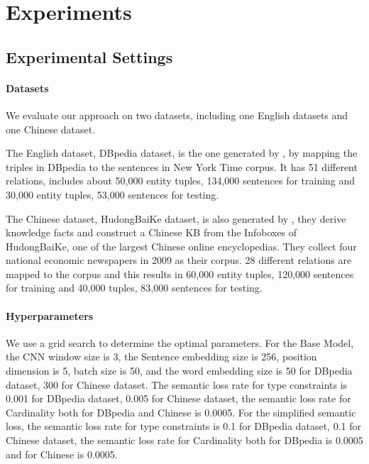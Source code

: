 \section{Experiments}

\subsection{Experimental Settings}
\paragraph{Datasets}
We evaluate our approach on two datasets, including one English datasets and one Chinese dataset.

The English dataset, DBpedia dataset, is the one generated by \cite{chen2014encoding}, by mapping the triples in DBpedia \cite{bizer2009dbpedia} to the sentences in New York Time corpus. It has 51 different relations, includes about 50,000 entity tuples, 134,000 sentences for training and 30,000 entity tuples, 53,000 sentences for testing.

The Chinese dataset, HudongBaiKe dataset, is also generated by \cite{chen2014encoding}, they derive knowledge facts and construct a Chinese KB from the Infoboxes of HudongBaiKe, one of the largest Chinese online encyclopedias. They collect four national economic newspapers in 2009 as their corpus. 28 different relations are mapped to the corpus and this results in 60,000 entity tuples, 120,000 sentences for training and 40,000 tuples, 83,000 sentences for testing.

\paragraph{Hyperparameters}
We use a grid search to determine the optimal parameters. For the Base Model, the CNN window size is 3, the Sentence embedding size is 256, position dimension is 5, batch size is 50, and the word embedding size is 50 for DBpedia dataset, 300 for Chinese dataset. The semantic loss rate for type constraints is 0.001 for DBpedia dataset, 0.005 for Chinese dataset, the semantic loss rate for Cardinality both for DBpedia and Chinese is 0.0005.
For the simplified semantic loss, the semantic loss rate for type constraints is 0.1 for DBpedia dataset, 0.1 for Chinese dataset, the semantic loss rate for Cardinality both for DBpedia is 0.0005 and for Chinese is 0.0005.

